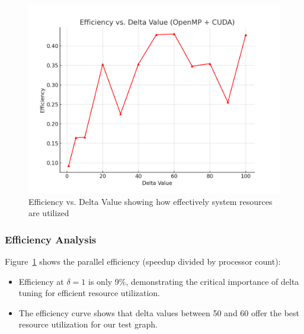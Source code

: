 \documentclass{article}
\begin{document}
\begin{figure}[ht]
    \centering
    \includegraphics[width=\linewidth]{efficiency_vs_delta.png}
    \caption{Efficiency vs. Delta Value showing how effectively system resources are utilized}
    \label{fig:efficiency_delta}
\end{figure}

\subsubsection*{Efficiency Analysis}

Figure~\ref{fig:efficiency_delta} shows the parallel efficiency (speedup divided by processor count):

\begin{itemize}
    
    \item Efficiency at $\delta=1$ is only 9\%, demonstrating the critical importance of delta tuning for efficient resource utilization.
    
    \item The efficiency curve shows that delta values between 50 and 60 offer the best resource utilization for our test graph.
\end{itemize}
\end{document}

